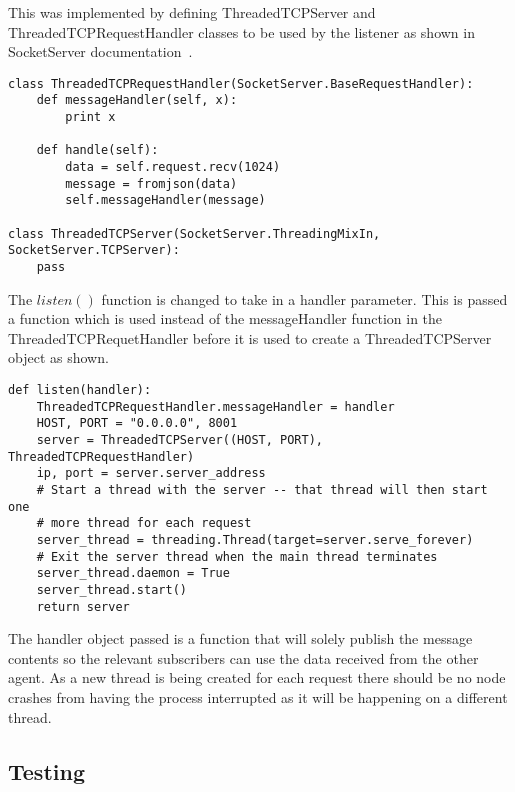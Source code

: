 This was implemented by defining ThreadedTCPServer and ThreadedTCPRequestHandler  
classes to be used by the listener as shown in SocketServer documentation~\cite{socketServerDocs}.
\begin{lstlisting}
class ThreadedTCPRequestHandler(SocketServer.BaseRequestHandler):
    def messageHandler(self, x):
        print x

    def handle(self):
        data = self.request.recv(1024)
        message = fromjson(data)
        self.messageHandler(message)

class ThreadedTCPServer(SocketServer.ThreadingMixIn, SocketServer.TCPServer):
    pass
\end{lstlisting}
The $listen()$ function is changed to take in a handler parameter. This is 
passed a function which is used instead of the messageHandler function in 
the ThreadedTCPRequetHandler before it is used to create a ThreadedTCPServer 
object as shown.
\begin{lstlisting}
def listen(handler):
    ThreadedTCPRequestHandler.messageHandler = handler
    HOST, PORT = "0.0.0.0", 8001
    server = ThreadedTCPServer((HOST, PORT), ThreadedTCPRequestHandler)
    ip, port = server.server_address
    # Start a thread with the server -- that thread will then start one
    # more thread for each request
    server_thread = threading.Thread(target=server.serve_forever)
    # Exit the server thread when the main thread terminates
    server_thread.daemon = True
    server_thread.start()
    return server
\end{lstlisting}
The handler object passed is a function that will solely publish the 
message contents so the relevant subscribers can use the data received 
from the other agent. As a new thread is being created for each request 
there should be no node crashes from having the process interrupted as 
it will be happening on a different thread.

\subsection{Testing}\label{soft/comms/test}


